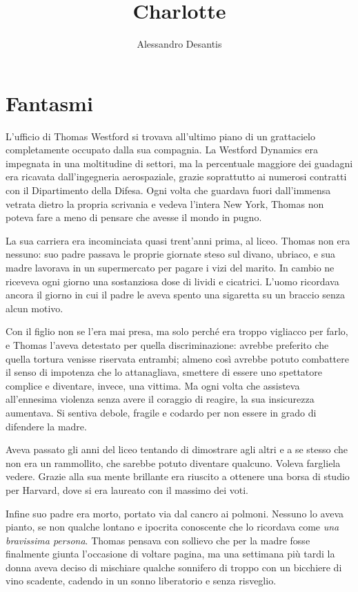 \documentclass[a4paper,oneside,11pt]{memoir}
\title{Charlotte}
\author{Alessandro Desantis}
\date{}
\begin{document}
\begin{titlingpage}
\maketitle
\end{titlingpage}

\chapter{Fantasmi}

L'ufficio di Thomas Westford si trovava all'ultimo piano di un grattacielo
completamente occupato dalla sua compagnia. La Westford Dynamics era impegnata
in una moltitudine di settori, ma la percentuale maggiore dei guadagni era
ricavata dall'ingegneria aerospaziale, grazie soprattutto ai numerosi contratti
con il Dipartimento della Difesa. Ogni volta che guardava fuori dall'immensa
vetrata dietro la propria scrivania e vedeva l'intera New York, Thomas non
poteva fare a meno di pensare che avesse il mondo in pugno.

La sua carriera era incominciata quasi trent'anni prima, al liceo. Thomas non
era nessuno: suo padre passava le proprie giornate steso sul divano, ubriaco, e
sua madre lavorava in un supermercato per pagare i vizi del marito. In cambio ne
riceveva ogni giorno una sostanziosa dose di lividi e cicatrici. L'uomo
ricordava ancora il giorno in cui il padre le aveva spento una sigaretta su un
braccio senza alcun motivo.

Con il figlio non se l'era mai presa, ma solo perché era troppo vigliacco per
farlo, e Thomas l'aveva detestato per quella discriminazione: avrebbe preferito
che quella tortura venisse riservata entrambi; almeno così avrebbe potuto
combattere il senso di impotenza che lo attanagliava, smettere di essere uno
spettatore complice e diventare, invece, una vittima. Ma ogni volta che
assisteva all'ennesima violenza senza avere il coraggio di reagire, la sua
insicurezza aumentava. Si sentiva debole, fragile e codardo per non essere in
grado di difendere la madre.

Aveva passato gli anni del liceo tentando di dimostrare agli altri e a se stesso
che non era un rammollito, che sarebbe potuto diventare qualcuno. Voleva
fargliela vedere. Grazie alla sua mente brillante era riuscito a ottenere una
borsa di studio per Harvard, dove si era laureato con il massimo dei voti.

Infine suo padre era morto, portato via dal cancro ai polmoni. Nessuno lo aveva
pianto, se non qualche lontano e ipocrita conoscente che lo ricordava come
\emph{una bravissima persona}. Thomas pensava con sollievo che per la madre
fosse finalmente giunta l'occasione di voltare pagina, ma una settimana più
tardi la donna aveva deciso di mischiare qualche sonnifero di troppo con un
bicchiere di vino scadente, cadendo in un sonno liberatorio e senza risveglio.
\end{document}
